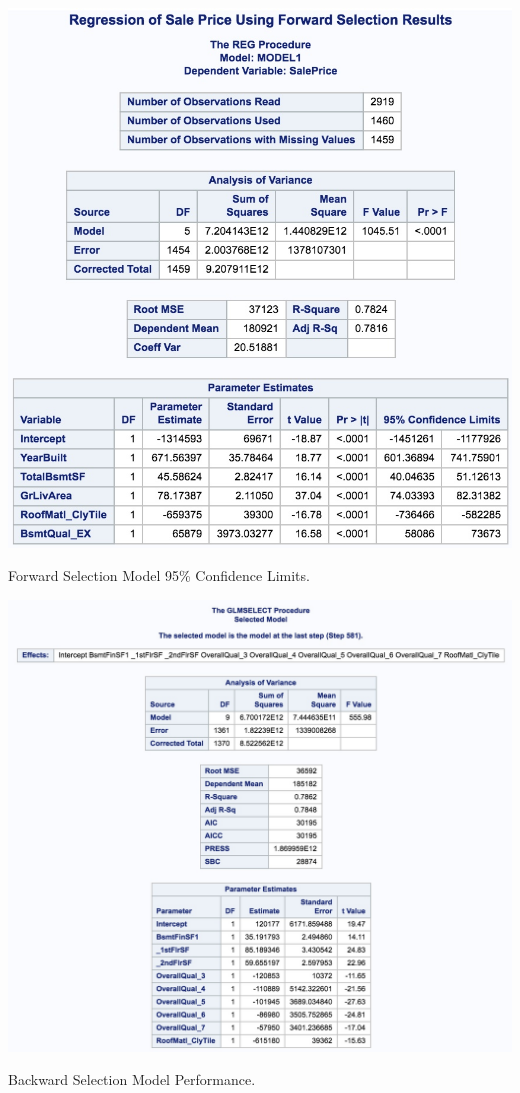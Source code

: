 \documentclass[11pt]{scrartcl} %
\begin{document}
\hrulefill
\begin{table}[H] %
	\centering %
	\includegraphics[scale=.3]{../graphics/A2FWCI}
	\caption{Forward Selection Model 95\% Confidence Limits.}
	\label{tab:A2FWCI}
\end{table}
\hrulefill
\begin{table}[H] %
	\centering %
	\includegraphics[scale=.3]{../graphics/A2BWresults}
	\caption{Backward Selection Model Performance.}
	\label{tab:A2BWperf}
\end{table}
\end{document}

